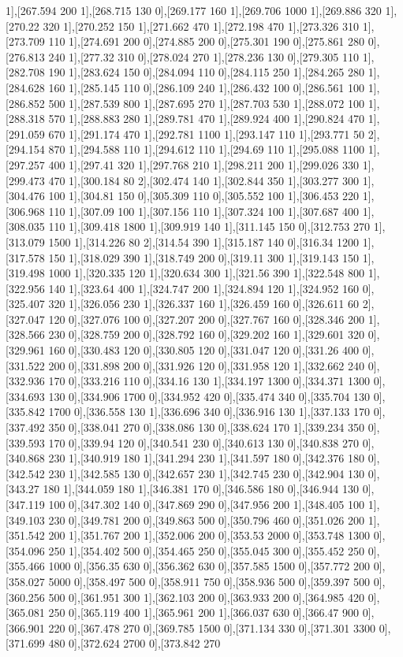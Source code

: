 {1],[267.594 200 1],[268.715 130 0],[269.177 160 1],[269.706 1000 1],[269.886 320 1],[270.22 320 1],[270.252 150 1],[271.662 470 1],[272.198 470 1],[273.326 310 1],[273.709 110 1],[274.691 200 0],[274.885 200 0],[275.301 190 0],[275.861 280 0],[276.813 240 1],[277.32 310 0],[278.024 270 1],[278.236 130 0],[279.305 110 1],[282.708 190 1],[283.624 150 0],[284.094 110 0],[284.115 250 1],[284.265 280 1],[284.628 160 1],[285.145 110 0],[286.109 240 1],[286.432 100 0],[286.561 100 1],[286.852 500 1],[287.539 800 1],[287.695 270 1],[287.703 530 1],[288.072 100 1],[288.318 570 1],[288.883 280 1],[289.781 470 1],[289.924 400 1],[290.824 470 1],[291.059 670 1],[291.174 470 1],[292.781 1100 1],[293.147 110 1],[293.771 50 2],[294.154 870 1],[294.588 110 1],[294.612 110 1],[294.69 110 1],[295.088 1100 1],[297.257 400 1],[297.41 320 1],[297.768 210 1],[298.211 200 1],[299.026 330 1],[299.473 470 1],[300.184 80 2],[302.474 140 1],[302.844 350 1],[303.277 300 1],[304.476 100 1],[304.81 150 0],[305.309 110 0],[305.552 100 1],[306.453 220 1],[306.968 110 1],[307.09 100 1],[307.156 110 1],[307.324 100 1],[307.687 400 1],[308.035 110 1],[309.418 1800 1],[309.919 140 1],[311.145 150 0],[312.753 270 1],[313.079 1500 1],[314.226 80 2],[314.54 390 1],[315.187 140 0],[316.34 1200 1],[317.578 150 1],[318.029 390 1],[318.749 200 0],[319.11 300 1],[319.143 150 1],[319.498 1000 1],[320.335 120 1],[320.634 300 1],[321.56 390 1],[322.548 800 1],[322.956 140 1],[323.64 400 1],[324.747 200 1],[324.894 120 1],[324.952 160 0],[325.407 320 1],[326.056 230 1],[326.337 160 1],[326.459 160 0],[326.611 60 2],[327.047 120 0],[327.076 100 0],[327.207 200 0],[327.767 160 0],[328.346 200 1],[328.566 230 0],[328.759 200 0],[328.792 160 0],[329.202 160 1],[329.601 320 0],[329.961 160 0],[330.483 120 0],[330.805 120 0],[331.047 120 0],[331.26 400 0],[331.522 200 0],[331.898 200 0],[331.926 120 0],[331.958 120 1],[332.662 240 0],[332.936 170 0],[333.216 110 0],[334.16 130 1],[334.197 1300 0],[334.371 1300 0],[334.693 130 0],[334.906 1700 0],[334.952 420 0],[335.474 340 0],[335.704 130 0],[335.842 1700 0],[336.558 130 1],[336.696 340 0],[336.916 130 1],[337.133 170 0],[337.492 350 0],[338.041 270 0],[338.086 130 0],[338.624 170 1],[339.234 350 0],[339.593 170 0],[339.94 120 0],[340.541 230 0],[340.613 130 0],[340.838 270 0],[340.868 230 1],[340.919 180 1],[341.294 230 1],[341.597 180 0],[342.376 180 0],[342.542 230 1],[342.585 130 0],[342.657 230 1],[342.745 230 0],[342.904 130 0],[343.27 180 1],[344.059 180 1],[346.381 170 0],[346.586 180 0],[346.944 130 0],[347.119 100 0],[347.302 140 0],[347.869 290 0],[347.956 200 1],[348.405 100 1],[349.103 230 0],[349.781 200 0],[349.863 500 0],[350.796 460 0],[351.026 200 1],[351.542 200 1],[351.767 200 1],[352.006 200 0],[353.53 2000 0],[353.748 1300 0],[354.096 250 1],[354.402 500 0],[354.465 250 0],[355.045 300 0],[355.452 250 0],[355.466 1000 0],[356.35 630 0],[356.362 630 0],[357.585 1500 0],[357.772 200 0],[358.027 5000 0],[358.497 500 0],[358.911 750 0],[358.936 500 0],[359.397 500 0],[360.256 500 0],[361.951 300 1],[362.103 200 0],[363.933 200 0],[364.985 420 0],[365.081 250 0],[365.119 400 1],[365.961 200 1],[366.037 630 0],[366.47 900 0],[366.901 220 0],[367.478 270 0],[369.785 1500 0],[371.134 330 0],[371.301 3300 0],[371.699 480 0],[372.624 2700 0],[373.842 270 }
